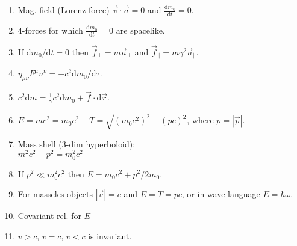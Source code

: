 \documentclass{article}
\renewcommand\d{\mathrm d}
\begin{document}
\begin{multicols}{3}
\begin{enumerate}
        \item Mag. field (Lorenz force) $\vec v\cdot\vec a=0$ and $\frac{\d m_0}{\d t}=0$.
        \item 4-forces for which $\frac{\d m_0}{\d t}=0$ are spacelike.
        \item If $\d m_0/\d t=0$ then $\vec f_\perp=m\vec a_\perp$ and $\vec f_\parallel=m\gamma^2\vec a_\parallel$.
        \item $\eta_{\mu\nu}F^\mu u^\nu=-c^2\d m_0/\d\tau$.
        \item $c^2\d m=\frac{1}{\gamma}c^2\d m_0+\vec f\cdot\d\vec r$.
        \item $E=mc^2=m_0c^2+T=\sqrt{(m_0c^2)^2+(pc)^2}$, where $p=|\vec p|$.
        \item Mass shell (3-dim hyperboloid):\\ $m^2c^2-p^2=m_0^2c^2$
        \item If $p^2\ll m_0^2c^2$ then $E=m_0c^2+p^2/2m_0$.
        \item For masseles objects $|\vec v|=c$ and $E=T=pc$, or in wave-language $E=\hbar\omega$.
        \item {\color{red} Covariant rel. for $E$}
        \item $v>c$, $v=c$, $v<c$ is invariant.
    \end{enumerate}




\end{multicols}
\end{document}
